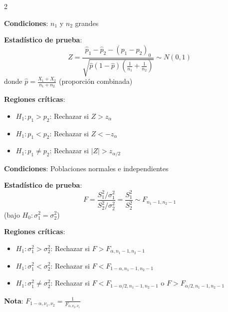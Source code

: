 \documentclass[10pt,a4paper]{article}
\begin{document}
\begin{multicols}{2}
    \begin{tcolorbox}[title=Diferencia de Proporciones, equal height group=CH5]
        \textbf{Condiciones}: $n_1$ y $n_2$ grandes
        
        \textbf{Estadístico de prueba}:
        \[
            Z = \frac{\hat{p}_1 - \hat{p}_2 - (p_1 - p_2)_0}{\sqrt{\hat{p}(1-\hat{p})\left(\frac{1}{n_1} + \frac{1}{n_2}\right)}} \sim N(0,1)
        \]
        donde $\hat{p} = \frac{X_1 + X_2}{n_1 + n_2}$ (proporción combinada)
        
        \textbf{Regiones críticas}:
        \begin{itemize}
            \item $H_1: p_1 > p_2$: Rechazar si $Z > z_\alpha$
            \item $H_1: p_1 < p_2$: Rechazar si $Z < -z_\alpha$
            \item $H_1: p_1 \neq p_2$: Rechazar si $|Z| > z_{\alpha/2}$
        \end{itemize}
    \end{tcolorbox}
    \begin{tcolorbox}[title=Cociente de Varianzas, equal height group=CH5]
        \textbf{Condiciones}: Poblaciones normales e independientes
        
        \textbf{Estadístico de prueba}:
        \[
            F = \frac{S_1^2/\sigma_1^2}{S_2^2/\sigma_2^2} = \frac{S_1^2}{S_2^2} \sim F_{n_1-1, n_2-1}
        \]
        (bajo $H_0: \sigma_1^2 = \sigma_2^2$)
        
        \textbf{Regiones críticas}:
        \begin{itemize}
            \item $H_1: \sigma_1^2 > \sigma_2^2$: Rechazar si $F > F_{\alpha, n_1-1, n_2-1}$
            \item $H_1: \sigma_1^2 < \sigma_2^2$: Rechazar si $F < F_{1-\alpha, n_1-1, n_2-1}$
            \item $H_1: \sigma_1^2 \neq \sigma_2^2$: Rechazar si $F < F_{1-\alpha/2, n_1-1, n_2-1}$ o $F > F_{\alpha/2, n_1-1, n_2-1}$
        \end{itemize}
        
        \textbf{Nota}: $F_{1-\alpha, \nu_1, \nu_2} = \frac{1}{F_{\alpha, \nu_2, \nu_1}}$
    \end{tcolorbox}
\end{multicols}
\end{document}
